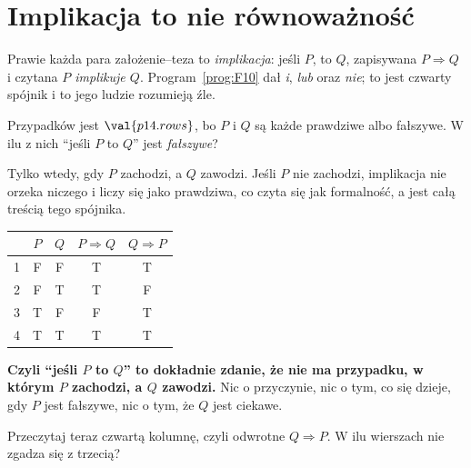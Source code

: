 \section{Implikacja to nie równoważność}
\label{sec:P14-implication}

\begin{fr}
Prawie każda para założenie--teza to \emph{implikacja}: jeśli $P$, to $Q$,
zapisywana $P \Rightarrow Q$ i czytana \emph{$P$ implikuje $Q$}.
Program~\ref{prog:F10} dał \emph{i}, \emph{lub} oraz \emph{nie}; to jest
czwarty spójnik i to jego ludzie rozumieją źle.

Przypadków jest $\val{p14.rows}$, bo $P$ i $Q$ są każde prawdziwe albo
fałszywe. W ilu z nich \enquote{jeśli $P$ to $Q$} jest \emph{fałszywe}?
\dotline
\nextframe
\end{fr}

\begin{fr}
Tylko wtedy, gdy $P$ zachodzi, a $Q$ zawodzi. Jeśli $P$ nie zachodzi,
implikacja nie orzeka niczego i liczy się jako prawdziwa, co czyta się jak
formalność, a jest całą treścią tego spójnika.

\begin{center}
\begin{tabular}{ccccc}
\toprule
& $P$ & $Q$ & $P \Rightarrow Q$ & $Q \Rightarrow P$ \\
\midrule
1 & F & F & T & T \\
2 & F & T & T & F \\
3 & T & F & F & T \\
4 & T & T & T & T \\
\bottomrule
\end{tabular}
\end{center}

\textbf{Czyli \enquote{jeśli $P$ to $Q$} to dokładnie zdanie, że nie ma
przypadku, w którym $P$ zachodzi, a $Q$ zawodzi.} Nic o przyczynie, nic o
tym, co się dzieje, gdy $P$ jest fałszywe, nic o tym, że $Q$ jest ciekawe.

Przeczytaj teraz czwartą kolumnę, czyli odwrotne $Q \Rightarrow P$. W ilu
wierszach nie zgadza się z trzecią?
\nextframe
\end{fr}


